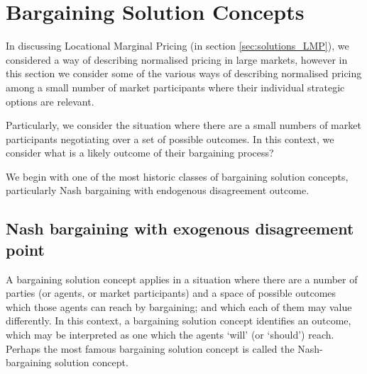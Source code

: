 \section{Bargaining Solution Concepts}\label{sec:solutions_bargaining}

In discussing Locational Marginal Pricing (in section \ref{sec:solutions_LMP}), we considered a way of describing normalised pricing in large markets, however in this section we consider some of the various ways of describing normalised pricing among a small number of market participants where their individual strategic options are relevant.

Particularly, we consider the situation where there are a small numbers of market participants negotiating over a set of possible outcomes.
In this context, we consider what is a likely outcome of their bargaining process?


We begin with one of the most historic classes of bargaining solution concepts, particularly Nash bargaining with endogenous disagreement outcome.

\subsection{Nash bargaining with exogenous disagreement point}\label{sec:nash_bargaining_exogenous}




A bargaining solution concept applies in a situation where there are a number of parties (or agents, or market participants) and a space of possible outcomes which those agents can reach by bargaining; and which each of them may value differently.
In this context, a bargaining solution concept identifies an outcome, which may be interpreted as one which the agents `will' (or `should') reach.
Perhaps the most famous bargaining solution concept is called the Nash-bargaining solution concept.

